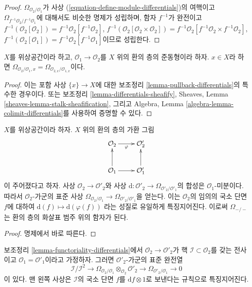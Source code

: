 \begin{proof}
$\Omega_{\mathcal{O}_2/\mathcal{O}_1}$가 사상
(\ref{equation-define-module-differentials})의 여핵이고
$\Omega_{f^{-1}\mathcal{O}_2/f^{-1}\mathcal{O}_1}$에 대해서도
비슷한 명제가 성립하며, 함자 $f^{-1}$가 완전이고
$f^{-1}(\mathcal{O}_2[\mathcal{O}_2]) =
f^{-1}\mathcal{O}_2[f^{-1}\mathcal{O}_2]$,
$f^{-1}(\mathcal{O}_2[\mathcal{O}_2 \times \mathcal{O}_2]) =
f^{-1}\mathcal{O}_2[f^{-1}\mathcal{O}_2 \times f^{-1}\mathcal{O}_2]$,
$f^{-1}(\mathcal{O}_2[\mathcal{O}_1]) =
f^{-1}\mathcal{O}_2[f^{-1}\mathcal{O}_1]$이므로 성립한다.
\end{proof}

\begin{lemma}
\label{lemma-stalk-module-differentials}
$X$를 위상공간이라 하고, $\mathcal{O}_1 \to \mathcal{O}_2$를
$X$ 위의 환의 층의 준동형이라 하자. $x \in X$라 하면
$\Omega_{\mathcal{O}_2/\mathcal{O}_1, x} =
\Omega_{\mathcal{O}_{2, x}/\mathcal{O}_{1, x}}$이다.
\end{lemma}

\begin{proof}
이는 포함 사상 $\{x\} \to X$에 대한 보조정리
\ref{lemma-pullback-differentials}의 특수한 경우이다.
또는 보조정리 \ref{lemma-differentials-sheafify},
Sheaves, Lemma \ref{sheaves-lemma-stalk-sheafification}, 그리고
Algebra, Lemma \ref{algebra-lemma-colimit-differentials}를 사용하여
증명할 수 있다.
\end{proof}

\begin{lemma}
\label{lemma-functoriality-differentials}
$X$를 위상공간이라 하자. $X$ 위의 환의 층의 가환 그림
$$
\xymatrix{
\mathcal{O}_2 \ar[r]_\varphi & \mathcal{O}_2' \\
\mathcal{O}_1 \ar[r] \ar[u] & \mathcal{O}'_1 \ar[u]
}
$$
이 주어졌다고 하자. 사상 $\mathcal{O}_2 \to \mathcal{O}'_2$와 사상
$\text{d} : \mathcal{O}'_2 \to \Omega_{\mathcal{O}'_2/\mathcal{O}'_1}$의
합성은 $\mathcal{O}_1$-미분이다. 따라서 $\mathcal{O}_2$-가군의 표준 사상
$\Omega_{\mathcal{O}_2/\mathcal{O}_1} \to
\Omega_{\mathcal{O}'_2/\mathcal{O}'_1}$을 얻는다.
이는 $\mathcal{O}_2$의 임의의 국소 단면 $f$에 대하여
$\text{d}(f) \mapsto \text{d}(\varphi(f))$
라는 성질로 유일하게 특징지어진다.
이로써 $\Omega_{-/-}$는 환의 층의 화살표 범주 위의 함자가 된다.
\end{lemma}

\begin{proof}
명제에서 바로 따른다.
\end{proof}

\begin{lemma}
\label{lemma-differential-seq}
보조정리 \ref{lemma-functoriality-differentials}에서
$\mathcal{O}_2 \to \mathcal{O}'_2$가 핵
$\mathcal{I} \subset \mathcal{O}_2$를 갖는 전사이고
$\mathcal{O}_1 = \mathcal{O}'_1$이라고 가정하자.
그러면 $\mathcal{O}'_2$-가군의 표준 완전열
$$
\mathcal{I}/\mathcal{I}^2
\longrightarrow
\Omega_{\mathcal{O}_2/\mathcal{O}_1} \otimes_{\mathcal{O}_2} \mathcal{O}'_2
\longrightarrow
\Omega_{\mathcal{O}'_2/\mathcal{O}_1}
\longrightarrow
0
$$
이 있다. 맨 왼쪽 사상은 $\mathcal{I}$의 국소 단면 $f$를
$\text{d}f \otimes 1$로 보낸다는 규칙으로 특징지어진다.
\end{lemma}

